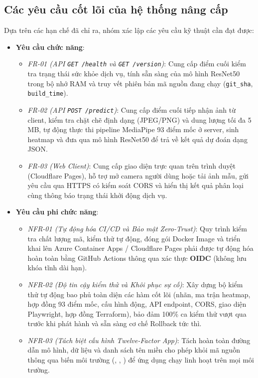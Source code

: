 \subsection{Các yêu cầu cốt lõi của hệ thống nâng cấp}
\label{subsec:yeu_cau_he_thong}

Dựa trên các hạn chế đã chỉ ra, nhóm xác lập các yêu cầu kỹ thuật cần đạt được:
\begin{itemize}
    \item \textbf{Yêu cầu chức năng}:
    \begin{itemize}
        \item \textit{FR-01 (API \texttt{GET /health} và \texttt{GET /version})}: Cung cấp điểm cuối kiểm tra trạng thái sức khỏe dịch vụ, tính sẵn sàng của mô hình ResNet50 trong bộ nhớ RAM và truy vết phiên bản mã nguồn đang chạy (\texttt{git\_sha}, \texttt{build\_time}).
        \item \textit{FR-02 (API \texttt{POST /predict})}: Cung cấp điểm cuối tiếp nhận ảnh từ client, kiểm tra chặt chẽ định dạng (JPEG/PNG) và dung lượng tối đa 5 MB, tự động thực thi pipeline MediaPipe 93 điểm mốc ở server, sinh heatmap và đưa qua mô hình ResNet50 để trả về kết quả dự đoán dạng JSON.
        \item \textit{FR-03 (Web Client)}: Cung cấp giao diện trực quan trên trình duyệt (Cloudflare Pages), hỗ trợ mở camera người dùng hoặc tải ảnh mẫu, gửi yêu cầu qua HTTPS có kiểm soát CORS và hiển thị kết quả phân loại cùng thông báo trạng thái khởi động dịch vụ.
    \end{itemize}
    \item \textbf{Yêu cầu phi chức năng}:
    \begin{itemize}
        \item \textit{NFR-01 (Tự động hóa CI/CD và Bảo mật Zero-Trust)}: Quy trình kiểm tra chất lượng mã, kiểm thử tự động, đóng gói Docker Image và triển khai lên Azure Container Apps / Cloudflare Pages phải được tự động hóa hoàn toàn bằng GitHub Actions thông qua xác thực \textbf{OIDC} (không lưu khóa tĩnh dài hạn).
        \item \textit{NFR-02 (Độ tin cậy kiểm thử và Khôi phục sự cố)}: Xây dựng bộ kiểm thử tự động bao phủ toàn diện các hàm cốt lõi (nhãn, ma trận heatmap, hợp đồng 93 điểm mốc, cấu hình động, API endpoint, CORS, giao diện Playwright, hợp đồng Terraform), bảo đảm 100\% ca kiểm thử vượt qua trước khi phát hành và sẵn sàng cơ chế Rollback tức thì.
        \item \textit{NFR-03 (Tách biệt cấu hình Twelve-Factor App)}: Tách hoàn toàn đường dẫn mô hình, dữ liệu và danh sách tên miền cho phép khỏi mã nguồn thông qua biến môi trường (, , ) để ứng dụng chạy linh hoạt trên mọi môi trường.
    \end{itemize}
\end{itemize}

